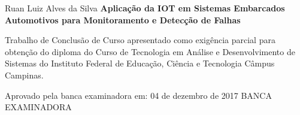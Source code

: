 \begin{folhadeaprovacao}
\linespread{1.5}

  \begin{center}
    {\chapterfont Ruan Luiz Alves da Silva}
    \vfill\vspace{2cm}
    {\chapterfont\bfseries Aplicação da IOT em Sistemas Embarcados Automotivos para Monitoramento e Detecção de Falhas}
    \vfill\vspace{1.5cm}
    \end{center}
    
    \hspace{.45\textwidth}
    \begin{minipage}{.47\linewidth}
	\vfill	
	Trabalho de Conclus\~{a}o de Curso apresentado como exig\^encia parcial para obten\c{c}\~{a}o do diploma do Curso de Tecnologia em An\'{a}lise e Desenvolvimento de Sistemas do Instituto Federal de Educa\c{c}\~{a}o, Ci\^{e}ncia e Tecnologia C\^{a}mpus Campinas.
    \end{minipage}
\vfill\vspace{1cm}  

\begin{center}
Aprovado pela banca examinadora em: 04 de dezembro de 2017
\vfill \vspace{1cm}
{\large BANCA EXAMINADORA}
\end{center}
\end{folhadeaprovacao}

